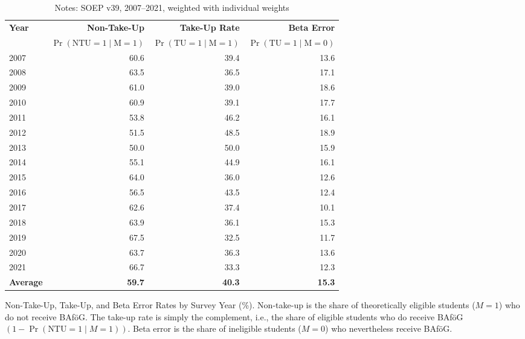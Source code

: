 \begin{table}[htbp]
\small
\centering
\begin{tabular}{l@{\hspace{2em}}r@{\hspace{2em}}r@{\hspace{2em}}r}
\toprule
\textbf{Year} & \textbf{Non-Take-Up} & \textbf{Take-Up Rate} & \textbf{Beta Error} \\
              & \(\Pr(\text{NTU} = 1 \mid \text{M} = 1)\) & \(\Pr(\text{TU} = 1 \mid \text{M} = 1)\) & \(\Pr(\text{TU} = 1 \mid \text{M} = 0)\) \\
\midrule
2007 & 60.6 & 39.4 & 13.6 \\
2008 & 63.5 & 36.5 & 17.1 \\
2009 & 61.0 & 39.0 & 18.6 \\
2010 & 60.9 & 39.1 & 17.7 \\
2011 & 53.8 & 46.2 & 16.1 \\
2012 & 51.5 & 48.5 & 18.9 \\
2013 & 50.0 & 50.0 & 15.9 \\
2014 & 55.1 & 44.9 & 16.1 \\
2015 & 64.0 & 36.0 & 12.6 \\
2016 & 56.5 & 43.5 & 12.4 \\
2017 & 62.6 & 37.4 & 10.1 \\
2018 & 63.9 & 36.1 & 15.3 \\
2019 & 67.5 & 32.5 & 11.7 \\
2020 & 63.7 & 36.3 & 13.6 \\
2021 & 66.7 & 33.3 & 12.3 \\
\midrule
\textbf{Average} & \textbf{59.7} & \textbf{40.3} & \textbf{15.3} \\
\bottomrule
\end{tabular}
\caption{\small{Non-Take-Up, Take-Up, and Beta Error Rates by Survey Year (\%). Non-take-up is the share of theoretically eligible students (\(M=1\)) who do not receive BAföG. The take-up rate is simply the complement, i.e., the share of eligible students who do receive BAföG \((1 - \Pr(\text{NTU} = 1 \mid M = 1))\). Beta error is the share of ineligible students (\(M=0\)) who nevertheless receive BAföG.}}
\caption*{\small{Notes: SOEP v39, 2007--2021, weighted with individual weights}}
\label{table:microsimulation-ntu}
\end{table}
